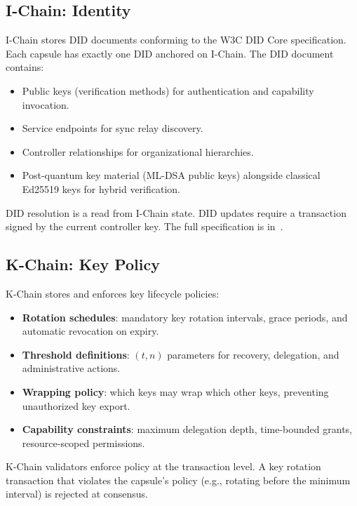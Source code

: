 \documentclass[11pt,a4paper]{article}
\begin{document}
\subsection{I-Chain: Identity}\label{sec:ichain}

I-Chain stores DID documents conforming to the W3C DID Core specification.
Each capsule has exactly one DID anchored on I-Chain. The DID document contains:

\begin{itemize}[nosep]
  \item Public keys (verification methods) for authentication and capability
        invocation.
  \item Service endpoints for sync relay discovery.
  \item Controller relationships for organizational hierarchies.
  \item Post-quantum key material (ML-DSA public keys) alongside classical
        Ed25519 keys for hybrid verification.
\end{itemize}

DID resolution is a read from I-Chain state. DID updates require a transaction
signed by the current controller key. The full specification is
in~\cite{lux-id-did}.

\subsection{K-Chain: Key Policy}\label{sec:kchain}

K-Chain stores and enforces key lifecycle policies:

\begin{itemize}[nosep]
  \item \textbf{Rotation schedules}: mandatory key rotation intervals, grace
        periods, and automatic revocation on expiry.
  \item \textbf{Threshold definitions}: $(t, n)$ parameters for recovery,
        delegation, and administrative actions.
  \item \textbf{Wrapping policy}: which keys may wrap which other keys,
        preventing unauthorized key export.
  \item \textbf{Capability constraints}: maximum delegation depth, time-bounded
        grants, resource-scoped permissions.
\end{itemize}

K-Chain validators enforce policy at the transaction level. A key rotation
transaction that violates the capsule's policy (e.g., rotating before the
minimum interval) is rejected at consensus.
\end{document}
